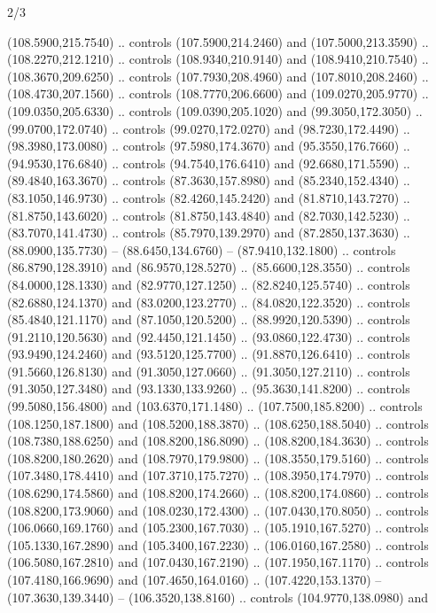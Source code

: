 \begin{flagdescription}{2/3}
\begin{scope}[xshift=0.5\flaglength,yshift=0.5\flagwidth,scale=\stretchfactor]
\begin{scope}[scale=0.001645\flagwidth,yshift=65mm,xshift=-63mm]
\begin{scope}[y=0.80pt, x=0.80pt, yscale=-1,]
\begin{scope}[cm={{1.33333,0.0,0.0,1.33333,(0.0,1e-05)}}]
  (108.5900,215.7540) .. controls (107.5900,214.2460) and (107.5000,213.3590) ..
  (108.2270,212.1210) .. controls (108.9340,210.9140) and (108.9410,210.7540) ..
  (108.3670,209.6250) .. controls (107.7930,208.4960) and (107.8010,208.2460) ..
  (108.4730,207.1560) .. controls (108.7770,206.6600) and (109.0270,205.9770) ..
  (109.0350,205.6330) .. controls (109.0390,205.1020) and (99.3050,172.3050) ..
  (99.0700,172.0740) .. controls (99.0270,172.0270) and (98.7230,172.4490) ..
  (98.3980,173.0080) .. controls (97.5980,174.3670) and (95.3550,176.7660) ..
  (94.9530,176.6840) .. controls (94.7540,176.6410) and (92.6680,171.5590) ..
  (89.4840,163.3670) .. controls (87.3630,157.8980) and (85.2340,152.4340) ..
  (83.1050,146.9730) .. controls (82.4260,145.2420) and (81.8710,143.7270) ..
  (81.8750,143.6020) .. controls (81.8750,143.4840) and (82.7030,142.5230) ..
  (83.7070,141.4730) .. controls (85.7970,139.2970) and (87.2850,137.3630) ..
  (88.0900,135.7730) -- (88.6450,134.6760) -- (87.9410,132.1800) .. controls
  (86.8790,128.3910) and (86.9570,128.5270) .. (85.6600,128.3550) .. controls
  (84.0000,128.1330) and (82.9770,127.1250) .. (82.8240,125.5740) .. controls
  (82.6880,124.1370) and (83.0200,123.2770) .. (84.0820,122.3520) .. controls
  (85.4840,121.1170) and (87.1050,120.5200) .. (88.9920,120.5390) .. controls
  (91.2110,120.5630) and (92.4450,121.1450) .. (93.0860,122.4730) .. controls
  (93.9490,124.2460) and (93.5120,125.7700) .. (91.8870,126.6410) .. controls
  (91.5660,126.8130) and (91.3050,127.0660) .. (91.3050,127.2110) .. controls
  (91.3050,127.3480) and (93.1330,133.9260) .. (95.3630,141.8200) .. controls
  (99.5080,156.4800) and (103.6370,171.1480) .. (107.7500,185.8200) .. controls
  (108.1250,187.1800) and (108.5200,188.3870) .. (108.6250,188.5040) .. controls
  (108.7380,188.6250) and (108.8200,186.8090) .. (108.8200,184.3630) .. controls
  (108.8200,180.2620) and (108.7970,179.9800) .. (108.3550,179.5160) .. controls
  (107.3480,178.4410) and (107.3710,175.7270) .. (108.3950,174.7970) .. controls
  (108.6290,174.5860) and (108.8200,174.2660) .. (108.8200,174.0860) .. controls
  (108.8200,173.9060) and (108.0230,172.4300) .. (107.0430,170.8050) .. controls
  (106.0660,169.1760) and (105.2300,167.7030) .. (105.1910,167.5270) .. controls
  (105.1330,167.2890) and (105.3400,167.2230) .. (106.0160,167.2580) .. controls
  (106.5080,167.2810) and (107.0430,167.2190) .. (107.1950,167.1170) .. controls
  (107.4180,166.9690) and (107.4650,164.0160) .. (107.4220,153.1370) --
  (107.3630,139.3440) -- (106.3520,138.8160) .. controls (104.9770,138.0980) and

\end{scope}
\end{scope}
\end{scope}
\end{scope}
\end{flagdescription}
